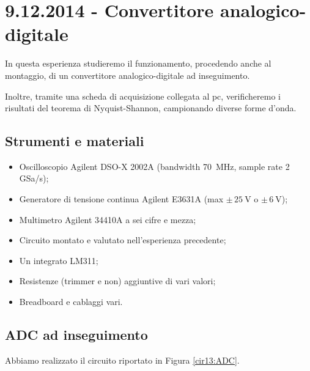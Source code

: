 \section{9.12.2014 - Convertitore analogico-digitale}

In questa esperienza studieremo il funzionamento, procedendo anche al montaggio, di un convertitore analogico-digitale ad inseguimento.

Inoltre, tramite una scheda di acquisizione collegata al pc, verificheremo i risultati del teorema di Nyquist-Shannon, campionando diverse forme d'onda.

\subsection*{Strumenti e materiali}

\begin{itemize} [noitemsep]
	\item Oscilloscopio Agilent DSO-X 2002A (bandwidth \SI{70}{\mega\hertz}, sample rate \num{2} GSa/s);
	\item Generatore di tensione continua Agilent E3631A (max $\pm \, \SI{25}{\volt}$ o $\pm \, \SI{6}{\volt}$);
	\item Multimetro Agilent 34410A a sei cifre e mezza;
	\item Circuito montato e valutato nell'esperienza precedente;
\item Un integrato LM311;	
\item Resistenze (trimmer e non) aggiuntive di vari valori;
\item Breadboard e cablaggi vari.
\end{itemize}

\subsection{ADC ad inseguimento}

Abbiamo realizzato il circuito riportato in Figura \ref{cir13:ADC}.

